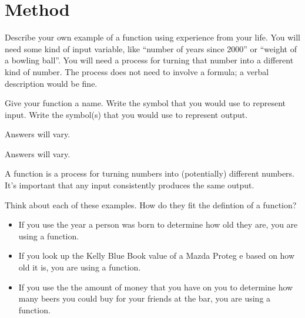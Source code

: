 \section{Method}\label{secondsection}
%
\begin{problem}\label{}
Describe your own example of a function using experience from your life. You will need some 
                    kind of input variable, like ``number of years since 2000'' or ``weight of a bowling ball''. You will 
				need a process for turning that number into a different kind of number. The process does not need to
                		involve a formula; a verbal description would be fine.
%
\par Give your function a name. Write the symbol that you would use to represent
                		input. Write the symbol(s) that you would use to represent output.
%
\begin{longsolution}
%
Answers will vary.
%
\end{longsolution}
%
\begin{shortsolution}
%
Answers will vary.
%
\end{shortsolution}
%
\end{problem}
%
\begin{definition}[Function]\label{}
A function is a process for turning numbers into (potentially) different numbers. 
			It's important that any input consistently produces the same output.\end{definition}
%
\begin{example}\label{}
Think about each of these examples. How do they fit the defintion of a function?
%
\begin{itemize}
\item If you use the year a person was born to determine how old they are, you are using a function.%
\item If you look up the Kelly Blue Book value of a Mazda Proteg\'{ e} based on how old it is, 
				you are using a function.%
\item If you use the the amount of money that you have on you to determine how many beers you could buy for 
				your friends at the bar, you are using a function.%
\end{itemize}
%
\end{example}
%
